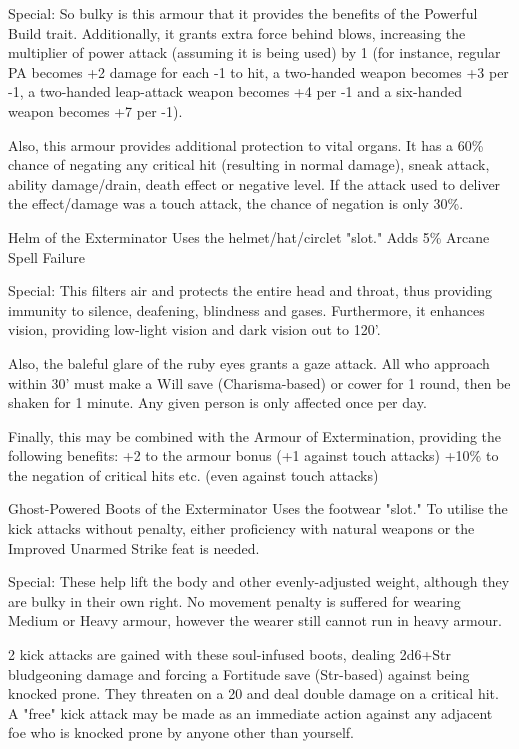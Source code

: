 Special:
So bulky is this armour that it provides the benefits of the Powerful Build trait. Additionally, it grants extra force behind blows, increasing the multiplier of power attack (assuming it is being used) by 1 (for instance, regular PA becomes +2 damage for each -1 to hit, a two-handed weapon becomes +3 per -1, a two-handed leap-attack weapon becomes +4 per -1 and a six-handed weapon becomes +7 per -1).

Also, this armour provides additional protection to vital organs. It has a 60\% chance of negating any critical hit (resulting in normal damage), sneak attack, ability damage/drain, death effect or negative level. If the attack used to deliver the effect/damage was a touch attack, the chance of negation is only 30\%.



Helm of the Exterminator
Uses the helmet/hat/circlet "slot."
Adds 5\% Arcane Spell Failure

Special:
This filters air and protects the entire head and throat, thus providing immunity to silence, deafening, blindness and gases. Furthermore, it enhances vision, providing low-light vision and dark vision out to 120'.

Also, the baleful glare of the ruby eyes grants a gaze attack. All who approach within 30' must make a Will save (Charisma-based) or cower for 1 round, then be shaken for 1 minute. Any given person is only affected once per day.

Finally, this may be combined with the Armour of Extermination, providing the following benefits:
+2 to the armour bonus (+1 against touch attacks)
+10\% to the negation of critical hits etc. (even against touch attacks)


Ghost-Powered Boots of the Exterminator
Uses the footwear "slot."
To utilise the kick attacks without penalty, either proficiency with natural weapons or the Improved Unarmed Strike feat is needed.

Special:
These help lift the body and other evenly-adjusted weight, although they are bulky in their own right. No movement penalty is suffered for wearing Medium or Heavy armour, however the wearer still cannot run in heavy armour.

2 kick attacks are gained with these soul-infused boots, dealing 2d6+Str bludgeoning damage and forcing a Fortitude save (Str-based) against being knocked prone. They threaten on a 20 and deal double damage on a critical hit. A "free" kick attack may be made as an immediate action against any adjacent foe who is knocked prone by anyone other than yourself.

